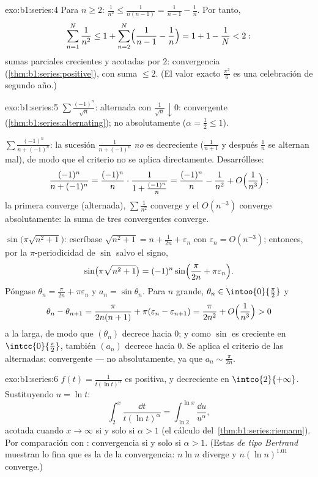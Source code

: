 \begin{solution}{exo:b1:series:4}
Para $n \geq 2$: $\frac{1}{n^2} \leq \frac{1}{n(n-1)} =
\frac{1}{n-1} - \frac1n$. Por tanto,
\[
\sum_{n=1}^{N} \frac{1}{n^2} \leq 1 + \sum_{n=2}^{N}
\Bigl(\frac{1}{n-1} - \frac1n\Bigr) = 1 + 1 - \frac1N < 2 :
\]
sumas parciales crecientes y acotadas por $2$: convergencia
(\cref{thm:b1:series:positive}), con suma $\leq 2$. (El valor exacto
$\frac{\pi^2}{6}$ es una celebración de segundo año.)
\end{solution}

\begin{solution}{exo:b1:series:5}
$\sum \frac{(-1)^n}{\sqrt n}$: alternada con
$\frac{1}{\sqrt n} \downarrow 0$: convergente
(\cref{thm:b1:series:alternating}); no absolutamente
($\alpha = \frac12 \leq 1$).

$\sum \frac{(-1)^n}{n + (-1)^n}$: la sucesión
$\frac{1}{n + (-1)^n}$ \emph{no} es decreciente ($\frac{1}{n+1}$ y
después $\frac{1}{n}$ se alternan mal), de modo que el criterio no se
aplica directamente. Desarróllese:
\[
\frac{(-1)^n}{n + (-1)^n}
= \frac{(-1)^n}{n}\cdot\frac{1}{1 + \frac{(-1)^n}{n}}
= \frac{(-1)^n}{n} - \frac{1}{n^2} +
O\Bigl(\frac{1}{n^3}\Bigr):
\]
la primera  converge (alternada), $\sum \frac{1}{n^2}$
converge y el $O(n^{-3})$ converge absolutamente: la suma de tres
 convergentes converge.

$\sin\bigl(\pi\sqrt{n^2+1}\bigr)$: escríbase
$\sqrt{n^2 + 1} = n + \frac{1}{2n} + \varepsilon_n$ con
$\varepsilon_n = O(n^{-3})$; entonces, por la $\pi$-periodicidad de
$\sin$ salvo el signo,
\[
\sin\bigl(\pi\sqrt{n^2+1}\bigr)
= (-1)^n \sin\Bigl(\frac{\pi}{2n} + \pi\varepsilon_n\Bigr) .
\]
Póngase $\theta_n = \frac{\pi}{2n} + \pi\varepsilon_n$ y
$a_n = \sin\theta_n$. Para $n$ grande,
$\theta_n \in \intoo{0}{\frac\pi2}$ y
\[
\theta_n - \theta_{n+1} = \frac{\pi}{2n(n+1)} +
\pi(\varepsilon_n - \varepsilon_{n+1})
= \frac{\pi}{2n^2} + O\Bigl(\frac{1}{n^3}\Bigr) > 0
\]
a la larga, de modo que $(\theta_n)$ decrece hacia $0$; y como $\sin$
es creciente en $\intcc{0}{\frac\pi2}$, también $(a_n)$ decrece hacia
$0$. Se aplica el criterio de las alternadas: convergente --- no
absolutamente, ya que $a_n \sim \frac{\pi}{2n}$.
\end{solution}

\begin{solution}{exo:b1:series:6}
$f(t) = \frac{1}{t(\ln t)^\alpha}$ es positiva,  y
decreciente en $\intco{2}{+\infty}$. Sustituyendo $u = \ln t$:
\[
\int_2^x \frac{\dd t}{t(\ln t)^\alpha}
= \int_{\ln 2}^{\ln x} \frac{\dd u}{u^\alpha},
\]
acotada cuando $x \to \infty$ si y solo si $\alpha > 1$ (el cálculo
del~\cref{thm:b1:series:riemann}). Por comparación con :
convergencia si y solo si $\alpha > 1$. (Estas  \emph{de tipo
Bertrand} muestran lo fina que es la  de la convergencia:
$n\ln n$ diverge y $n(\ln n)^{1.01}$ converge.)
\end{solution}

